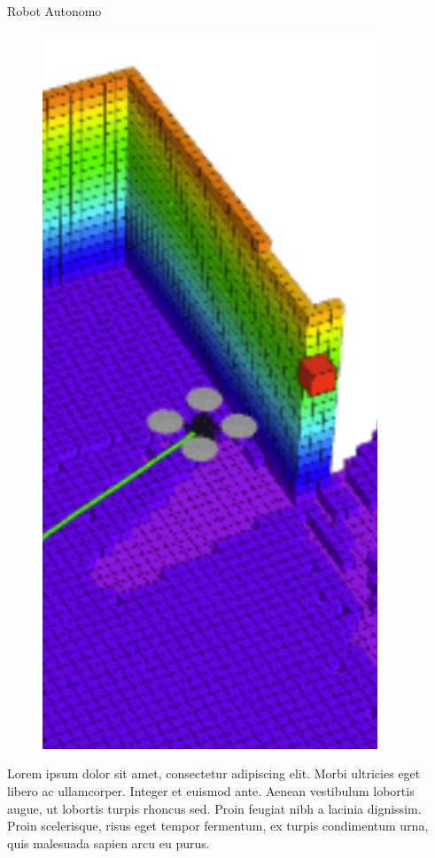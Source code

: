 \documentclass[final]{beamer}
\newlength{\colwidth}
\begin{document}
\begin{frame}[t]
\begin{columns}[t]
\begin{column}{\colwidth}
\begin{block}{\color{teal}Robot Autonomo}
\begin{multicols}{2}
    \begin{figure}
      \centering
      \includegraphics[width=10cm]{images/drone_vuelo.png}
      \end{figure}
    \end{multicols}
    Lorem ipsum dolor sit amet, consectetur adipiscing elit. Morbi ultricies
    eget libero ac ullamcorper. Integer et euismod ante. Aenean vestibulum
    lobortis augue, ut lobortis turpis rhoncus sed. Proin feugiat nibh a
    lacinia dignissim. Proin scelerisque, risus eget tempor fermentum, ex
    turpis condimentum urna, quis malesuada sapien arcu eu purus.

  \end{block}
\end{column}


\end{columns}
\end{frame}
\end{document}
